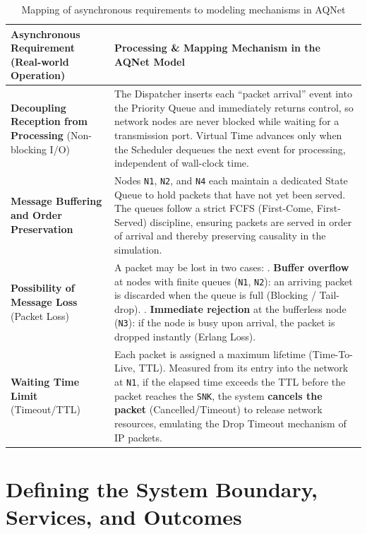 \begin{table}[H]
\centering
\begin{tabular}{|p{3.6cm}|p{10cm}|}
\hline
\textbf{Asynchronous Requirement (Real-world Operation)} & \textbf{Processing \& Mapping Mechanism in the AQNet Model} \\
\hline
\textbf{Decoupling Reception from Processing} (Non-blocking I/O) &
The Dispatcher inserts each ``packet arrival'' event into the Priority Queue and immediately returns control, so network nodes are never blocked while waiting for a transmission port. Virtual Time advances only when the Scheduler dequeues the next event for processing, independent of wall-clock time. \\
\hline
\textbf{Message Buffering and Order Preservation} &
Nodes \texttt{N1}, \texttt{N2}, and \texttt{N4} each maintain a dedicated State Queue to hold packets that have not yet been served. The queues follow a strict FCFS (First-Come, First-Served) discipline, ensuring packets are served in order of arrival and thereby preserving causality in the simulation. \\
\hline
\textbf{Possibility of Message Loss} (Packet Loss) &
A packet may be lost in two cases: \newline
1. \textbf{Buffer overflow} at nodes with finite queues (\texttt{N1}, \texttt{N2}): an arriving packet is discarded when the queue is full (Blocking / Tail-drop). \newline
2. \textbf{Immediate rejection} at the bufferless node (\texttt{N3}): if the node is busy upon arrival, the packet is dropped instantly (Erlang Loss). \\
\hline
\textbf{Waiting Time Limit} (Timeout/TTL) &
Each packet is assigned a maximum lifetime (Time-To-Live, TTL). Measured from its entry into the network at \texttt{N1}, if the elapsed time exceeds the TTL before the packet reaches the \texttt{SNK}, the system \textbf{cancels the packet} (Cancelled/Timeout) to release network resources, emulating the Drop Timeout mechanism of IP packets. \\
\hline
\end{tabular}
\caption{Mapping of asynchronous requirements to modeling mechanisms in AQNet}
\label{tab:aqnet-async}
\end{table}




\section{Defining the System Boundary, Services, and Outcomes}
